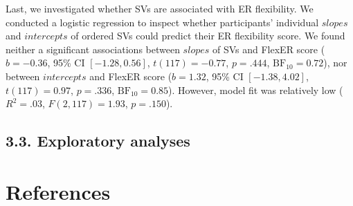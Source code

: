 \documentclass[
  man,floatsintext]{apa6}
\begin{document}
Last, we investigated whether SVs are associated with ER flexibility.
We conducted a logistic regression to inspect whether participants' individual \(slopes\) and \(intercepts\) of ordered SVs could predict their ER flexibility score.
We found neither a significant associations between \(slopes\) of SVs and FlexER score (\(b = -0.36\), 95\% CI \([-1.28, 0.56]\), \(t(117) = -0.77\), \(p = .444\), \(\mathrm{BF}_{\textrm{10}} = 0.72\)), nor between \(intercepts\) and FlexER score (\(b = 1.32\), 95\% CI \([-1.38, 4.02]\), \(t(117) = 0.97\), \(p = .336\), \(\mathrm{BF}_{\textrm{10}} = 0.85\)).
However, model fit was relatively low (\(R^2 = .03\), \(F(2, 117) = 1.93\), \(p = .150\)).

\hypertarget{exploratory-analyses}{%
\subsection{3.3. Exploratory analyses}\label{exploratory-analyses}}

\hypertarget{references}{%
\section{References}\label{references}}

\begingroup
\setlength{\parindent}{-0.5in}
\setlength{\leftskip}{0.5in}
\end{document}
